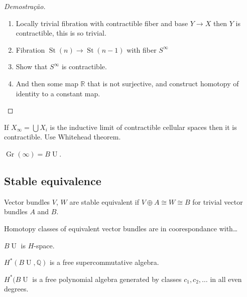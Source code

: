 \begin{proof}[Demostra\c c\~ao]
	\begin{enumerate}[label=\textbf{Step \arabic*}]
		\item Locally trivial fibration with contractible fiber and base $Y\to X$ then $Y$ is contractible, this is so trivial.

		\item Fibration $ \operatorname{St}(n)\to \operatorname{St}(n-1)$ with fiber $S^\infty$ 

		\item Show that $S^\infty$ is contractible.

		\item And then some map $\mathbb{R}$ that is not surjective, and construct homotopy of identity to a constant map.
	\end{enumerate}
\end{proof}

\begin{exercise}
	If $X_{\infty}=\bigcup X_{i} $ is the inductive limit of contractible cellular spaces then it is contractible. Use Whitehead theorem.
\end{exercise}

\begin{thm}[Important]\leavevmode
	$\operatorname{Gr}(\infty)=B\operatorname{U}$.
\end{thm}

\subsection{Stable equivalence}

\begin{defn}
	Vector bundles $V$,  $W$ are stable equivalent if  $V\oplus A\cong W\cong B$ for trivial vector bundles  $A$ and $B$.
\end{defn}

Homotopy classes of equivalent vector bundles are in coorespondance with…

\begin{thm}
	$B\operatorname{U}$ is $H$-space.
\end{thm}

\begin{coro}
	$H^* (B\operatorname{U},\mathbb{Q})$ is a free supercommutative algebra.
\end{coro}

\begin{claim}
	$H^*(B\operatorname{U}$ is a free polynomial algebra generated by classes $c_1,c_2,\ldots$ in all even degrees.
\end{claim}


